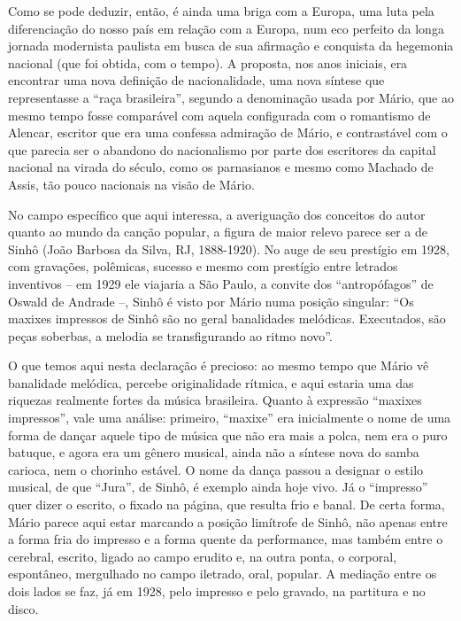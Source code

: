 Como se pode deduzir, então, é ainda uma briga com a Europa, uma luta
pela diferenciação do nosso país em relação com a Europa, num eco
perfeito da longa jornada modernista paulista em busca de sua afirmação
e conquista da hegemonia nacional (que foi obtida, com o tempo). A
proposta, nos anos iniciais, era encontrar uma nova definição de
nacionalidade, uma nova síntese que representasse a ``raça brasileira'',
segundo a denominação usada por Mário, que ao mesmo tempo fosse
comparável com aquela configurada com o romantismo de Alencar, escritor
que era uma confessa admiração de Mário, e contrastável com o que
parecia ser o abandono do nacionalismo por parte dos escritores da
capital nacional na virada do século, como os parnasianos e mesmo como
Machado de Assis, tão pouco nacionais na visão de Mário.

No campo específico que aqui interessa, a averiguação dos conceitos do
autor quanto ao mundo da canção popular, a figura de maior relevo parece
ser a de Sinhô (João Barbosa da Silva, RJ, 1888-1920). No auge de seu
prestígio em 1928, com gravações, polêmicas, sucesso e mesmo com
prestígio entre letrados inventivos -- em 1929 ele viajaria a São Paulo,
a convite dos ``antropófagos'' de Oswald de Andrade --, Sinhô é visto
por Mário numa posição singular: ``Os maxixes impressos de Sinhô são no
geral banalidades melódicas. Executados, são peças soberbas, a melodia
se transfigurando ao ritmo novo''.

O que temos aqui nesta declaração é precioso: ao mesmo tempo que Mário
vê banalidade melódica, percebe originalidade rítmica, e aqui estaria
uma das riquezas realmente fortes da música brasileira. Quanto à
expressão ``maxixes impressos'', vale uma análise: primeiro, ``maxixe''
era inicialmente o nome de uma forma de dançar aquele tipo de música que
não era mais a polca, nem era o puro batuque, e agora era um gênero
musical, ainda não a síntese nova do samba carioca, nem o chorinho
estável. O nome da dança passou a designar o estilo musical, de que
``Jura'', de Sinhô, é exemplo ainda hoje vivo. Já o ``impresso'' quer
dizer o escrito, o fixado na página, que resulta frio e banal. De certa
forma, Mário parece aqui estar marcando a posição limítrofe de Sinhô,
não apenas entre a forma fria do impresso e a forma quente da
performance, mas também entre o cerebral, escrito, ligado ao campo
erudito e, na outra ponta, o corporal, espontâneo, mergulhado no campo
iletrado, oral, popular. A mediação entre os dois lados se faz, já em
1928, pelo impresso e pelo gravado, na partitura e no disco.

